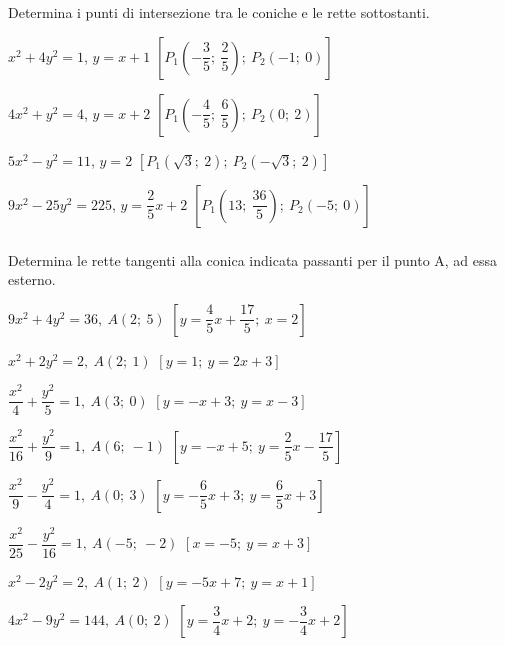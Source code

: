 \begin{esercizio}
  \label{ese:div.003}
  Determina i punti di intersezione tra le coniche e le rette 
sottostanti.
  \begin{enumeratea}
  \item \( x^{2}+4y^{2}=1 \), \(y=x+1\)
  \hfill\(\left[P_{1}\left( -\dfrac{3}{5};~\dfrac{2}{5} \right);~ 
P_{2}\left(-1;~0\right)\right]\)
  \item  \(4x^{2}+y^{2}=4 \), \(y=x+2\)
  \hfill\(\left[P_{1}\left( -\dfrac{4}{5};~\dfrac{6}{5} \right);~ 
P_{2}\left(0;~2\right)\right]\)
  \item \(5x^{2}-y^{2}=11 \), \(y=2\)
  \hfill\(\left[P_{1}\left( \sqrt{3};~2 \right);~ 
P_{2}\left(-\sqrt{3};~2\right)\right]\)
  \item \(9x^{2}-25y^{2}=225 \), \(y=\dfrac{2}{5}x+2\)
  \hfill \(\left[P_{1}\left(13;~\dfrac{36}{5} \right);~ 
P_{2}\left(-5;~0\right)\right]\)
  \end{enumeratea}
\end{esercizio}

\subsubsection*{}

\begin{esercizio}
  \label{ese:div.003}
  Determina le rette tangenti alla conica indicata passanti per il 
punto A, ad essa esterno.
  \begin{enumeratea}

\item \(9x^{2}+4y^{2}=36,~A(2;~5)\)  
\hfill \(\left[y=\dfrac{4}{5}x+\dfrac{17}{5};~x=2\right]\)
\item \(x^{2}+2y^{2}=2,~A(2;~1)\)
\hfill \(\left[y=1;~y=2x+3\right]\)
\item \(\dfrac{x^{2}}{4}+\dfrac{y^{2}}{5}=1,~A(3;~0)\)
\hfill \(\left[y=-x+3;~y=x-3\right]\)
\item \(\dfrac{x^{2}}{16}+\dfrac{y^{2}}{9}=1,~A(6;~-1)\)
\hfill \(\left[y=-x+5;~y=\dfrac{2}{5}x-\dfrac{17}{5}\right]\)
\item \(\dfrac{x^{2}}{9}-\dfrac{y^{2}}{4}=1,~A(0;~3)\)
\hfill \(\left[y=-\dfrac{6}{5}x+3;~y=\dfrac{6}{5}x+3\right]\)
\item \(\dfrac{x^{2}}{25}-\dfrac{y^{2}}{16}=1,~A(-5;~-2)\) 
\hfill \(\left[x=-5;~y=x+3\right]\)
\item \(x^{2}-2y^{2}=2,~A(1;~2)\)
\hfill \(\left[y=-5x+7;~y=x+1\right]\)
\item \(4x^{2}-9y^{2}=144,~A(0;~2)\)
\hfill \(\left[y=\dfrac{3}{4}x+2;~y=-\dfrac{3}{4}x+2\right]\)
\end{enumeratea}
\end{esercizio}

